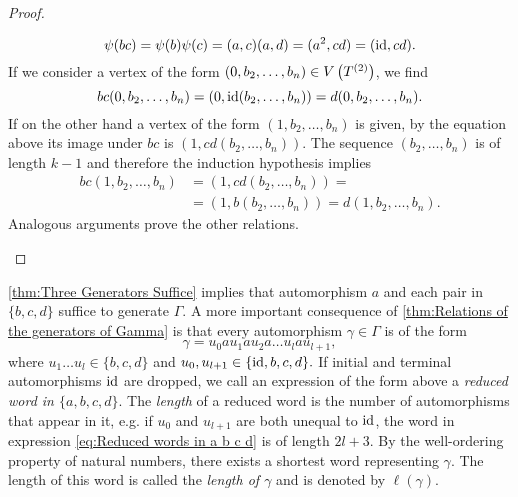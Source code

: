 \begin{proof}
\begin{plist}
\begin{equation*}
\psi(bc)=\psi(b)\psi(c)=(a,c)(a,d)=(a^2,cd)=(\operatorname{id},cd).
\end{equation*}
If we consider a vertex of the form $(0,b_2,\ldots,b_n)\in V\left(T^{(2)}\right)$, we find
\begin{equation*}
bc(0,b_2,\ldots,b_n)=(0,\operatorname{id}(b_2,\ldots,b_n))=d(0,b_2,\ldots,b_n).
\end{equation*}
If on the other hand a vertex of the form $(1,b_2,\ldots,b_n)$ is given, by the equation above its image under $bc$ is  $(1,cd(b_2,\ldots,b_n)).$ The sequence $(b_2,\ldots,b_n)$ is of length $k-1$ and therefore the induction hypothesis implies
\begin{align*}
bc(1,b_2,\ldots,b_n)&=(1,cd(b_2,\ldots,b_n))=\\
&=(1,b(b_2,\ldots,b_n))=d(1,b_2,\ldots,b_n).
\end{align*}
Analogous arguments prove the other relations.
\end{plist}
\end{proof}

\cref{thm:Three Generators Suffice} implies that automorphism $a$ and each pair in $\lbrace b,c,d\rbrace$ suffice to generate $\Gamma.$ A more important consequence of \cref{thm:Relations of the generators of Gamma} is that every automorphism $\gamma\in\Gamma$ is of the form
\begin{equation}\label{eq:Reduced words in a b c d}
\gamma=u_0au_1au_2a\ldots u_lau_{l+1},
\end{equation}
where $u_1\ldots u_{l}\in\lbrace b,c,d\rbrace$ and $u_0,u_{l+1}\in\lbrace \operatorname{id},b,c,d\rbrace.$ If initial and terminal automorphisms $\operatorname{id}$ are dropped, we call an expression of the form above a \emph{reduced word in $\lbrace a,b,c,d\rbrace$}. The \emph{length} of a reduced word is the number of automorphisms that appear in it, e.g. if $u_0$ and $u_{l+1}$ are both unequal to $\operatorname{id}$, the word in expression \ref{eq:Reduced words in a b c d} is of length $2l+3$. By the well-ordering property of natural numbers, there exists a shortest word representing $\gamma$. The length of this word is called the \emph{length of $\gamma$} and is denoted by $\ell(\gamma)$. 